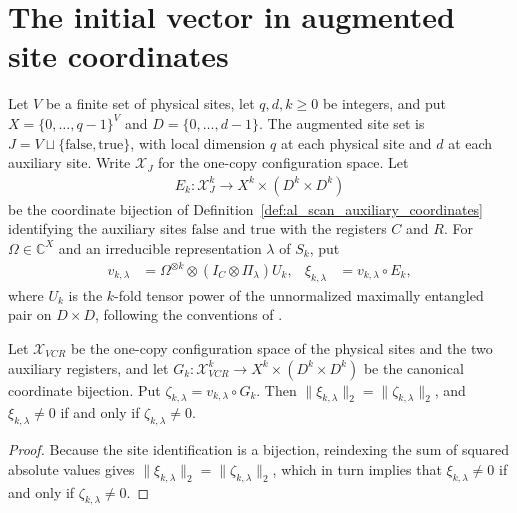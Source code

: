 \section{The initial vector in augmented site coordinates}

Let $V$ be a finite set of physical sites, let $q,d,k\ge0$ be integers,
and put $X=\{0,\ldots,q-1\}^V$ and $D=\{0,\ldots,d-1\}$.
The augmented site set is $J=V\sqcup\{\mathrm{false},\mathrm{true}\}$, with
local dimension $q$ at each physical site and $d$ at each auxiliary site.
Write $\mathcal X_J$ for the one-copy configuration space.
Let
\begin{align*}
    E_k:\mathcal X_J^k\longrightarrow X^k\times(D^k\times D^k)
\end{align*}
be the coordinate bijection of Definition~\ref{def:al_scan_auxiliary_coordinates}
identifying the auxiliary sites $\mathrm{false}$ and $\mathrm{true}$ with the registers $C$ and $R$.
For $\Omega\in\mathbb C^X$ and an irreducible representation $\lambda$ of $S_k$, put
\begin{align*}
    v_{k,\lambda}               & =\Omega^{\otimes k}\otimes
    (I_C\otimes\Pi_\lambda)U_k, &
    \xi_{k,\lambda}             & =v_{k,\lambda}\circ E_k,
\end{align*}
where $U_k$ is the $k$-fold tensor power of the unnormalized maximally entangled pair on $D\times D$, following the conventions of \cite[Section~7]{OpenAI2026AreaLaw}.

\begin{lemma}
    \label{thm:al_augmented_prevector_norm}
    \leanok
    Let $\mathcal X_{VCR}$ be the one-copy configuration space of the
    physical sites and the two auxiliary registers, and let
    $G_k:\mathcal X_{VCR}^k\to X^k\times(D^k\times D^k)$ be the canonical
    coordinate bijection. Put $\zeta_{k,\lambda}=v_{k,\lambda}\circ G_k$.
    Then $\|\xi_{k,\lambda}\|_2=\|\zeta_{k,\lambda}\|_2$, and
    $\xi_{k,\lambda}\ne0$ if and only if $\zeta_{k,\lambda}\ne0$.
\end{lemma}
\begin{proof}
    \leanok
    Because the site identification is a bijection, reindexing the sum of
    squared absolute values gives $\|\xi_{k,\lambda}\|_2=\|\zeta_{k,\lambda}\|_2$,
    which in turn implies that $\xi_{k,\lambda}\ne0$ if and only if
    $\zeta_{k,\lambda}\ne0$.
\end{proof}


